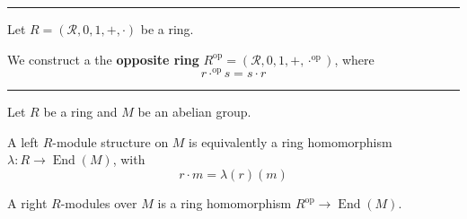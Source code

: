 \documentclass[12pt]{article}
\newcommand{\keyword}[1]{\textbf{#1}}
\newcommand{\sepline}{\rule{\textwidth}{0.4pt}}
\theoremstyle{definition}
\newcommand{\RR}{\mathcal{R}}
\newcommand{\<}{\left\langle}
\renewcommand{\>}{\right\rangle}
\newcommand{\op}{\mathrm{op}}
\DeclareMathOperator{\End}{End}
\begin{document}
\sepline

Let $R = (\RR, 0, 1, +, \cdot)$ be a ring.

We construct a the \keyword{opposite ring} $R^\op = (\RR, 0, 1, +, \cdot^\op)$, where
\[
    r \cdot^\op s = s \cdot r
\]

\sepline

Let $R$ be a ring and $M$ be an abelian group.

A left $R$-module structure on $M$ is equivalently a ring homomorphism $\lambda : R \to \End(M)$, with
\[
    r \cdot m = \lambda(r)(m)
\]

A right $R$-modules over $M$ is a ring homomorphism $R^\op \to \End(M)$.
\end{document}
